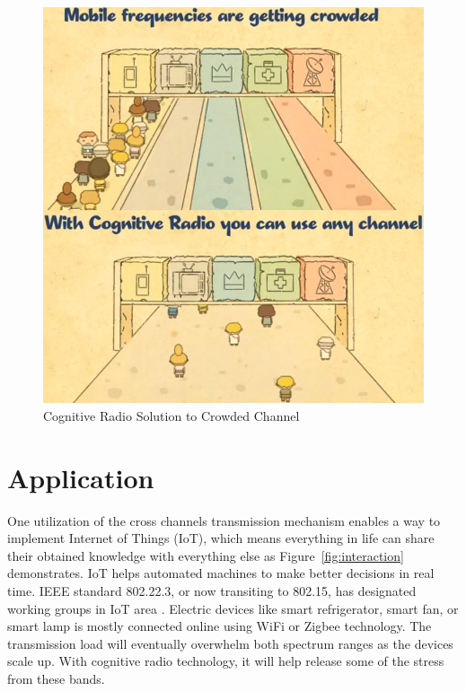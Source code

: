 \begin{figure}[ht]
\centering
\includegraphics[width=14cm]{figures/cognitive_radio_channel.jpg}
\caption{Cognitive Radio Solution to Crowded Channel \cite{nokia_blog}}
\label{fig:cognitive_radio_crowded_channel}
\end{figure}

\section{Application}

One utilization of the cross channels transmission mechanism enables a way to implement Internet of Things (IoT), which means
everything in life can share their obtained knowledge with everything else as Figure~\ref{fig:interaction} demonstrates. 
IoT helps automated machines to make better 
decisions in real time. IEEE standard 802.22.3, or now transiting to 802.15, has designated working groups in IoT area
\cite{ieee_working_group}. Electric devices like smart refrigerator, smart fan, or smart lamp is mostly connected online
using WiFi or Zigbee technology. The transmission load will eventually overwhelm both spectrum ranges as the devices scale
up. With cognitive radio technology, it will help release some of the stress from these bands.

